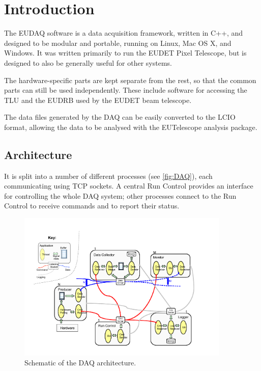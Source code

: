 \section{Introduction}
The EUDAQ software is a data acquisition framework, written in C++,
and designed to be modular and portable, running on Linux, Mac OS X, and Windows.
It was written primarily to run the EUDET Pixel Telescope\cite{Roloff:2009zza},
but is designed to also be generally useful for other systems.

The hardware-specific parts are kept separate from the rest,
so that the common parts can still be used independently.
These include software for accessing the \gls{TLU} and the \gls{EUDRB} used by the EUDET beam telescope.

The data files generated by the DAQ can be easily converted to the \gls{LCIO} format,
allowing the data to be analysed with the EUTelescope\cite{eutel2008} analysis package.

\subsection{Architecture}
It is split into a number of different processes (see \autoref{fig:DAQ}),
each communicating using TCP sockets.
A central Run Control provides an interface for controlling the whole DAQ system;
other processes connect to the Run Control to receive commands and to report their status.

\begin{figure}[htb]
  \begin{center}
    \includegraphics[width=0.9\textwidth]{src/images/DAQ}
    \caption{Schematic of the DAQ architecture.}
    \label{fig:DAQ}
  \end{center}
\end{figure}


